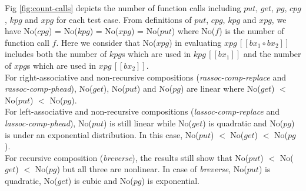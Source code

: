 \documentclass[runningheads]{llncs}
\newcommand{\kpginline}[1]{kpg \, [\![#1]\!]}
\newcommand{\xpginline}[1]{xpg \, [\![#1]\!]}
\begin{document}
Fig \ref{fig:count-calls} depicts the number of function calls including $put$, $get$, $pg$, $cpg$, $kpg$ and $xpg$ for each test case. From definitions of $put$, $cpg$, $kpg$ and $xpg$, we have No($cpg$) = No($kpg$) = No($xpg$) = No($put$) where No($f$) is the number of function call $f$. Here we consider that No($xpg$) in evaluating $\xpginline{bx_1 \circ bx_2}$ includes both the number of $kpg$s which are used in $\kpginline{bx_1}$ and the number of $xpg$s which are used in $\xpginline{bx_2}$.\\

For right-associative and non-recursive compositions (\textit{rassoc-comp-replace} and \textit{rassoc-comp-phead}), No($get$), No($put$) and No($pg$) are linear where No($get$) $<$ No($put$) $<$ No($pg$).\\

For left-associative and non-recursive compositions (\textit{lassoc-comp-replace} and \textit{lassoc-comp-phead}), No($put$) is still linear while No($get$) is quadratic and No($pg$) is under an exponential distribution. In this case, No($put$) $<$ No($get$) $<$ No($pg$).\\

For recursive composition (\textit{breverse}), the results still show that No($put$) $<$ No($get$) $<$ No($pg$) but all three are nonlinear. In case of \textit{breverse}, No($put$) is quadratic, No($get$) is cubic and No($pg$) is exponential.\\
\end{document}
